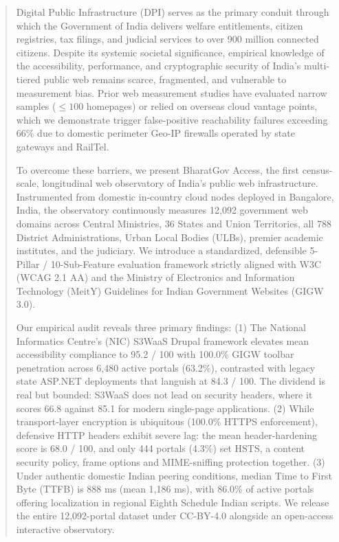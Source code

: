 \documentclass[conference]{IEEEtran}
\begin{document}
\begin{abstract}
Digital Public Infrastructure (DPI) serves as the primary conduit through which the Government of India delivers welfare entitlements, citizen registries, tax filings, and judicial services to over 900 million connected citizens. Despite its systemic societal significance, empirical knowledge of the accessibility, performance, and cryptographic security of India's multi-tiered public web remains scarce, fragmented, and vulnerable to measurement bias. Prior web measurement studies have evaluated narrow samples ($\le 100$ homepages) or relied on overseas cloud vantage points, which we demonstrate trigger false-positive reachability failures exceeding 66\% due to domestic perimeter Geo-IP firewalls operated by state gateways and RailTel. 

To overcome these barriers, we present BharatGov Access, the first census-scale, longitudinal web observatory of India's public web infrastructure. Instrumented from domestic in-country cloud nodes deployed in Bangalore, India, the observatory continuously measures 12,092 government web domains across Central Ministries, 36 States and Union Territories, all 788 District Administrations, Urban Local Bodies (ULBs), premier academic institutes, and the judiciary. We introduce a standardized, defensible 5-Pillar / 10-Sub-Feature evaluation framework strictly aligned with W3C (WCAG 2.1 AA) and the Ministry of Electronics and Information Technology (MeitY) Guidelines for Indian Government Websites (GIGW 3.0).

Our empirical audit reveals three primary findings: (1) The National Informatics Centre's (NIC) S3WaaS Drupal framework elevates mean accessibility compliance to 95.2 / 100 with 100.0\% GIGW toolbar penetration across 6,480 active portals (63.2\%), contrasted with legacy state ASP.NET deployments that languish at 84.3 / 100. The dividend is real but bounded: S3WaaS does not lead on security headers, where it scores 66.8 against 85.1 for modern single-page applications. (2) While transport-layer encryption is ubiquitous (100.0\% HTTPS enforcement), defensive HTTP headers exhibit severe lag: the mean header-hardening score is 68.0 / 100, and only 444 portals (4.3\%) set HSTS, a content security policy, frame options and MIME-sniffing protection together. (3) Under authentic domestic Indian peering conditions, median Time to First Byte (TTFB) is 888 ms (mean 1,186 ms), with 86.0\% of active portals offering localization in regional Eighth Schedule Indian scripts. We release the entire 12,092-portal dataset under CC-BY-4.0 alongside an open-access interactive observatory.
\end{abstract}
\end{document}
